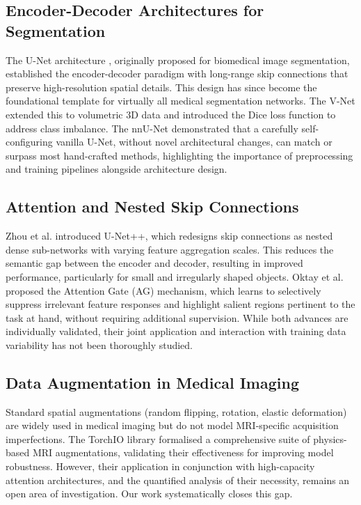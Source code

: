 \documentclass[conference]{IEEEtran}
\begin{document}
\subsection{Encoder-Decoder Architectures for Segmentation}
The U-Net architecture \cite{ronneberger2015u}, originally proposed for biomedical image segmentation, established the encoder-decoder paradigm with long-range skip connections that preserve high-resolution spatial details. This design has since become the foundational template for virtually all medical segmentation networks. The V-Net \cite{milletari2016v} extended this to volumetric 3D data and introduced the Dice loss function to address class imbalance. The nnU-Net \cite{isensee2021nnu} demonstrated that a carefully self-configuring vanilla U-Net, without novel architectural changes, can match or surpass most hand-crafted methods, highlighting the importance of preprocessing and training pipelines alongside architecture design.

\subsection{Attention and Nested Skip Connections}
Zhou et al. \cite{zhou2018unet++} introduced U-Net++, which redesigns skip connections as nested dense sub-networks with varying feature aggregation scales. This reduces the semantic gap between the encoder and decoder, resulting in improved performance, particularly for small and irregularly shaped objects. Oktay et al. \cite{oktay2018attention} proposed the Attention Gate (AG) mechanism, which learns to selectively suppress irrelevant feature responses and highlight salient regions pertinent to the task at hand, without requiring additional supervision. While both advances are individually validated, their joint application and interaction with training data variability has not been thoroughly studied.

\subsection{Data Augmentation in Medical Imaging}
Standard spatial augmentations (random flipping, rotation, elastic deformation) are widely used in medical imaging but do not model MRI-specific acquisition imperfections. The TorchIO library \cite{perez2021torchio} formalised a comprehensive suite of physics-based MRI augmentations, validating their effectiveness for improving model robustness. However, their application in conjunction with high-capacity attention architectures, and the quantified analysis of their necessity, remains an open area of investigation. Our work systematically closes this gap.
\end{document}
